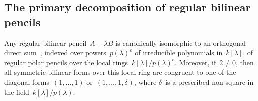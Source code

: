 \documentclass{lms}
\DeclareMathOperator\Ker{Ker}
\begin{document}
% 
% 
% 
% 
\subsection{The primary decomposition of regular bilinear pencils}
\label{S:bil-regular}

Any regular bilinear pencil~$A - λ B$ is canonically isomorphic to
an orthogonal direct sum~\cite[Theorem 4.2]{inventiones1976waterhouse},
indexed over powers~$p(λ)^e$ of irreducible polynomials in~$k[λ]$,
of regular polar pencils over the local rings~$k[λ]/p(λ)^e$.
Moreover, if~$2 ≠ 0$, then all symmetric bilinear forms over this local ring
are congruent to one of the diagonal forms~$(1,…,1)$ or~$(1,…,1,δ)$,
where $δ$~is a prescribed non-square in the field~$k[λ]/p(λ)$.
\end{document}
